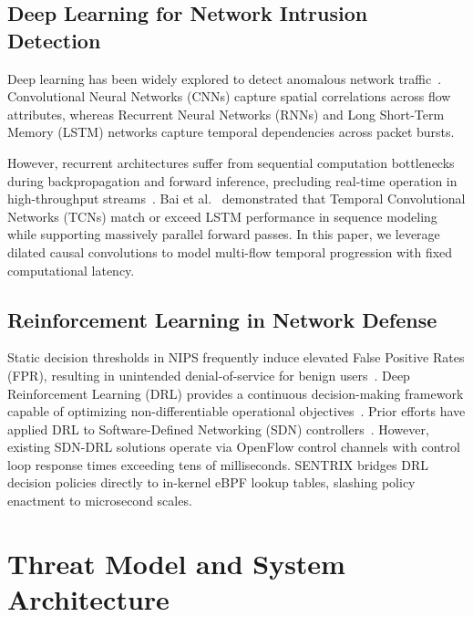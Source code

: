 \documentclass[conference,10pt]{IEEEtran}
\begin{document}
\subsection{Deep Learning for Network Intrusion Detection}
Deep learning has been widely explored to detect anomalous network traffic~\cite{vinayakumar2019deep, sommer2010outside}. Convolutional Neural Networks (CNNs) capture spatial correlations across flow attributes, whereas Recurrent Neural Networks (RNNs) and Long Short-Term Memory (LSTM) networks capture temporal dependencies across packet bursts.

However, recurrent architectures suffer from sequential computation bottlenecks during backpropagation and forward inference, precluding real-time operation in high-throughput streams~\cite{bai2018empirical}. Bai et al.~\cite{bai2018empirical} demonstrated that Temporal Convolutional Networks (TCNs) match or exceed LSTM performance in sequence modeling while supporting massively parallel forward passes. In this paper, we leverage dilated causal convolutions to model multi-flow temporal progression with fixed computational latency.

\subsection{Reinforcement Learning in Network Defense}
Static decision thresholds in NIPS frequently induce elevated False Positive Rates (FPR), resulting in unintended denial-of-service for benign users~\cite{sommer2010outside}. Deep Reinforcement Learning (DRL) provides a continuous decision-making framework capable of optimizing non-differentiable operational objectives~\cite{mnih2015human, schulman2017proximal}. Prior efforts have applied DRL to Software-Defined Networking (SDN) controllers~\cite{alavizadeh2021automated, he2022deep}. However, existing SDN-DRL solutions operate via OpenFlow control channels with control loop response times exceeding tens of milliseconds. SENTRIX bridges DRL decision policies directly to in-kernel eBPF lookup tables, slashing policy enactment to microsecond scales.

\section{Threat Model and System Architecture}
\end{document}
